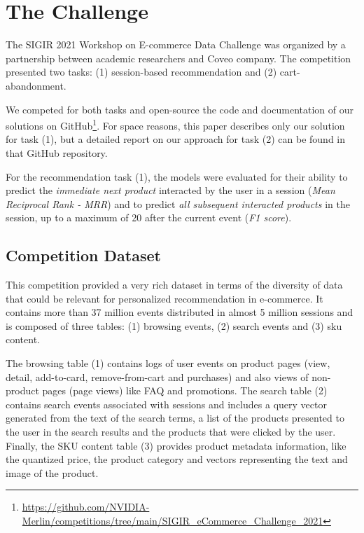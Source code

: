 \documentclass[sigconf,screen]{acmart}
\begin{document}
\vspace{-3.0mm}


\section{The Challenge}
\label{sec:challenge}

The SIGIR 2021 Workshop on E-commerce Data Challenge \cite{tagliabue2021sigir} was organized by a partnership between academic researchers and Coveo company. The competition presented two tasks: (1) session-based recommendation and (2) cart-abandonment.

We competed for both tasks and open-source the code and documentation of our solutions on GitHub\footnote{\url{https://github.com/NVIDIA-Merlin/competitions/tree/main/SIGIR_eCommerce_Challenge_2021}}. For space reasons, this paper describes only our solution for task (1), but a detailed report on our approach for task (2) can be found in that GitHub repository.

For the recommendation task (1), the models were evaluated for their ability to predict the \emph{immediate next product} interacted by the user in a session (\emph{Mean Reciprocal Rank - MRR}) and to predict \emph{all subsequent interacted products} in the session, up to a maximum of 20 after the current event (\emph{F1 score}).

\subsection{Competition Dataset}

This competition provided a very rich dataset in terms of the diversity of data that could be relevant for personalized recommendation in e-commerce. It contains more than 37 million events distributed in almost 5 million sessions and is composed of three tables: (1) browsing events, (2) search events and (3) sku content. 

The browsing table (1) contains logs of user events on product pages (view, detail, add-to-card, remove-from-cart and purchases) and also views of non-product pages (page views) like FAQ and promotions. The search table (2) contains search events associated with sessions and includes a query vector generated from the text of the search terms, a list of the products presented to the user in the search results and the products that were clicked by the user. Finally, the SKU content table (3) provides product metadata information, like the quantized price, the product category and vectors representing the text and image of the product. 
\end{document}
